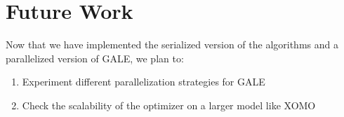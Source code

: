 \documentclass[conference]{IEEEtran}
\begin{document}
	
	\section{Future Work}
	\label{future}
	
	Now that we have implemented the serialized version of the algorithms and a parallelized version of GALE, we plan to:
	\begin{enumerate}
		\item Experiment different parallelization strategies for GALE
		\item Check the scalability of the optimizer on a larger model like XOMO\cite{menzies05xomo}
	\end{enumerate}
	\newpage
	
	
\end{document}
